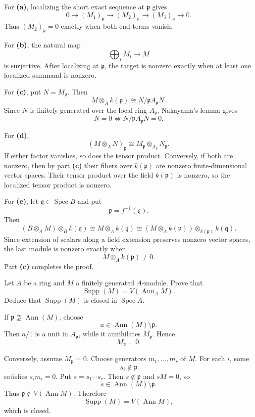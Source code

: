 \begin{solution}
For \textbf{(a)}, localizing the short exact sequence at \(\mathfrak p\) gives
\[
0\to(M_1)_{\mathfrak p}
\to(M_2)_{\mathfrak p}
\to(M_3)_{\mathfrak p}
\to0.
\]
Thus \((M_2)_{\mathfrak p}=0\) exactly when both end terms vanish.

For \textbf{(b)}, the natural map
\[
\bigoplus_iM_i\to M
\]
is surjective. After localizing at \(\mathfrak p\), the target is nonzero
exactly when at least one localized summand is nonzero.

For \textbf{(c)}, put \(N=M_{\mathfrak p}\). Then
\[
M\otimes_Ak(\mathfrak p)
\cong
N/\mathfrak pA_{\mathfrak p}N.
\]
Since \(N\) is finitely generated over the local ring \(A_{\mathfrak p}\),
Nakayama's lemma gives
\[
N=0
\iff
N/\mathfrak pA_{\mathfrak p}N=0.
\]

For \textbf{(d)},
\[
(M\otimes_AN)_{\mathfrak p}
\cong
M_{\mathfrak p}\otimes_{A_{\mathfrak p}}N_{\mathfrak p}.
\]
If either factor vanishes, so does the tensor product. Conversely, if both
are nonzero, then by part \textbf{(c)} their fibers over \(k(\mathfrak p)\)
are nonzero finite-dimensional vector spaces. Their tensor product over the
field \(k(\mathfrak p)\) is nonzero, so the localized tensor product is
nonzero.

For \textbf{(e)}, let \(\mathfrak q\in\operatorname{Spec}B\) and put
\[
\mathfrak p=f^{-1}(\mathfrak q).
\]
Then
\[
(B\otimes_AM)\otimes_Bk(\mathfrak q)
\cong
M\otimes_Ak(\mathfrak q)
\cong
(M\otimes_Ak(\mathfrak p))
\otimes_{k(\mathfrak p)}k(\mathfrak q).
\]
Since extension of scalars along a field extension preserves nonzero vector
spaces, the last module is nonzero exactly when
\[
M\otimes_Ak(\mathfrak p)\ne0.
\]
Part \textbf{(c)} completes the proof.
\end{solution}


\begin{problem}[CP-V-0107]
\label{prob:cp-v-0107}
Let \(A\) be a ring and \(M\) a finitely generated \(A\)-module. Prove that
\[
\operatorname{Supp}(M)=V(\operatorname{Ann}_A M).
\]
Deduce that \(\operatorname{Supp}(M)\) is closed in \(\operatorname{Spec}A\).
\end{problem}

\begin{solution}
If \(\mathfrak p\not\supseteq\operatorname{Ann}(M)\), choose
\[
a\in\operatorname{Ann}(M)\setminus\mathfrak p.
\]
Then \(a/1\) is a unit in \(A_{\mathfrak p}\), while it annihilates \(M_{\mathfrak p}\). Hence
\[
M_{\mathfrak p}=0.
\]

Conversely, assume \(M_{\mathfrak p}=0\). Choose generators \(m_1,\dots,m_r\) of \(M\). For each \(i\), some
\[
s_i\notin\mathfrak p
\]
satisfies \(s_im_i=0\). Put \(s=s_1\cdots s_r\). Then \(s\notin\mathfrak p\) and \(sM=0\), so
\[
s\in\operatorname{Ann}(M)\setminus\mathfrak p.
\]
Thus \(\mathfrak p\notin V(\operatorname{Ann}M)\). Therefore
\[
\operatorname{Supp}(M)=V(\operatorname{Ann}M),
\]
which is closed.
\end{solution}



